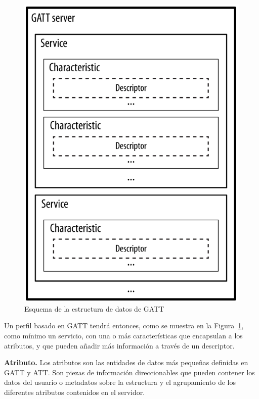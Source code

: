\begin{figure}[h]%
	\centering
    \includegraphics[scale=0.5]{figures/ble_gatt_hierarchy.png} %
    \caption[Esquema de la estructura de datos de GATT]{Esquema de la estructura de datos de GATT}
   	\label{figuraBLEGATTHierarchy}
\end{figure}

Un perfil basado en GATT tendrá entonces, como se muestra en la Figura~\ref{figuraBLEGATTHierarchy}, como mínimo un servicio, con una o más características que encapsulan a los atributos, y que pueden añadir más información a través de un descriptor.

\textbf{Atributo.} Los atributos son las entidades de datos más pequeñas definidas en GATT y ATT. Son piezas de información direccionables que pueden contener los datos del usuario o metadatos sobre la estructura y el agrupamiento de los diferentes atributos contenidos en el servidor.

